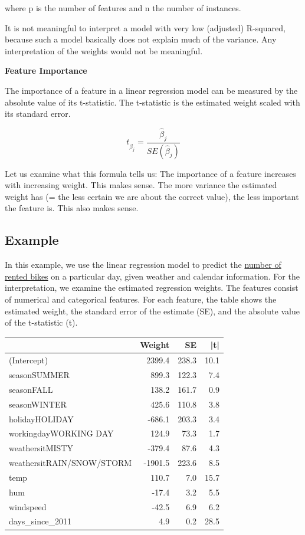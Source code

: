 \documentclass[
  12pt,
]{krantz}
\begin{document}
where p is the number of features and n the number of instances.

It is not meaningful to interpret a model with very low (adjusted) R-squared, because such a model basically does not explain much of the variance.
Any interpretation of the weights would not be meaningful.

\textbf{Feature Importance}

The importance of a feature in a linear regression model can be measured by the absolute value of its t-statistic.
The t-statistic is the estimated weight scaled with its standard error.

\[t_{\hat{\beta}_j}=\frac{\hat{\beta}_j}{SE(\hat{\beta}_j)}\]

Let us examine what this formula tells us:
The importance of a feature increases with increasing weight.
This makes sense.
The more variance the estimated weight has (= the less certain we are about the correct value), the less important the feature is.
This also makes sense.

\hypertarget{example}{%
\subsection{Example}\label{example}}

In this example, we use the linear regression model to predict the \protect\hyperlink{bike-data}{number of rented bikes} on a particular day, given weather and calendar information.
For the interpretation, we examine the estimated regression weights.
The features consist of numerical and categorical features.
For each feature, the table shows the estimated weight, the standard error of the estimate (SE), and the absolute value of the t-statistic (\textbar t\textbar).

\begin{tabular}{l|r|r|r}
\hline
  & Weight & SE & |t|\\
\hline
(Intercept) & 2399.4 & 238.3 & 10.1\\
\hline
seasonSUMMER & 899.3 & 122.3 & 7.4\\
\hline
seasonFALL & 138.2 & 161.7 & 0.9\\
\hline
seasonWINTER & 425.6 & 110.8 & 3.8\\
\hline
holidayHOLIDAY & -686.1 & 203.3 & 3.4\\
\hline
workingdayWORKING DAY & 124.9 & 73.3 & 1.7\\
\hline
weathersitMISTY & -379.4 & 87.6 & 4.3\\
\hline
weathersitRAIN/SNOW/STORM & -1901.5 & 223.6 & 8.5\\
\hline
temp & 110.7 & 7.0 & 15.7\\
\hline
hum & -17.4 & 3.2 & 5.5\\
\hline
windspeed & -42.5 & 6.9 & 6.2\\
\hline
days\_since\_2011 & 4.9 & 0.2 & 28.5\\
\hline
\end{tabular}
\end{document}
